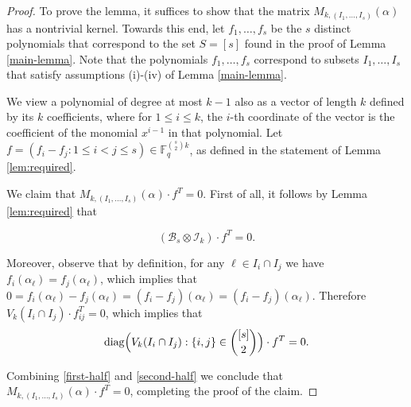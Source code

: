\documentclass[11pt]{article}
\newcommand\black[1]{{\color{black} #1}}
\begin{document}
\begin{proof}
To prove the lemma, it suffices to show that the matrix  $M_{k,(I_1,\ldots,I_{s})}(\alpha)$ has a nontrivial kernel. Towards this end, let $f_1,\ldots,f_{s}$ be the $s$  distinct polynomials that correspond to the set $S=[s]$ found in the proof of  Lemma \ref{main-lemma}. \black{Note that the polynomials $f_1,\ldots,f_s$ correspond to subsets $I_1,\ldots,I_s$ that satisfy assumptions (i)-(iv) of Lemma \ref{main-lemma}}.

We view a polynomial of degree at most $k-1$ also as a   vector of length $k$  defined by its $k$ coefficients, where for $1\le i\le k$, the $i$-th coordinate of the vector is the coefficient of the monomial $x^{i-1}$ in that polynomial.  %
Let  $f=(f_i-f_j: 1\leq i<j\leq s)\in\mathbb{F}_q^{\binom{s}{2}k}$, as defined in the statement of Lemma \ref{lem:required}. %

We claim that $M_{k,(I_1,\ldots,I_{s})}(\alpha)\cdot f^T=0$. First of all, it follows by Lemma \ref{lem:required} that

\begin{equation}\label{first-half}
 (\mathcal{B}_s\otimes \mathcal{I}_k)\cdot f^T=0.
\end{equation}

\noindent Moreover, observe that by definition, for any $\ell\in I_i\cap I_j$ we have $f_i(\alpha_{\ell})=f_j(\alpha_{\ell})$, which implies that $0=f_i(\alpha_{\ell})-f_j(\alpha_{\ell})=(f_i-f_j)(\alpha_{\ell})=(f_i-f_j)(\alpha_{\ell})$. Therefore  $V_k(I_i\cap I_j)\cdot f_{ij}^T=0$, which implies that
\begin{equation}\label{second-half}
 {\rm diag}\Big(V_k(I_i\cap I_j): \{i,j\}\in \binom{[s]}{2}\Big)\cdot f^T=0.
\end{equation}

\noindent Combining \eqref{first-half} and \eqref{second-half} we conclude that $M_{k,(I_1,\ldots,I_{s})}(\alpha)\cdot f^T=0$, completing the proof of the claim.
\end{proof}
\end{document}
